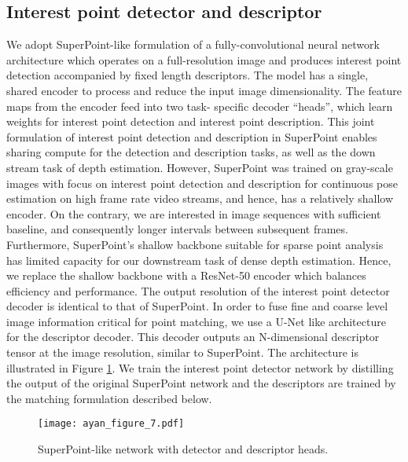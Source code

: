 \documentclass[runningheads]{llncs}
\begin{document}
\subsection{Interest point detector and descriptor}
We adopt SuperPoint-like \cite{superpoint} formulation of a fully-convolutional neural network architecture which operates on a full-resolution image and produces interest point detection accompanied by fixed length descriptors. The model has a single, shared encoder to process and reduce the input image dimensionality. The feature maps from the encoder feed into two task- specific decoder “heads”, which learn weights for interest point detection and interest point description. This joint formulation of interest point detection and description in SuperPoint enables sharing compute for the detection and description tasks, as well as the down stream task of depth estimation. However, SuperPoint was trained on gray-scale images with focus on interest point detection and description for continuous pose estimation on high frame rate video streams, and hence, has a relatively shallow encoder. On the contrary, we are interested in image sequences with sufficient baseline, and consequently longer intervals between subsequent frames. Furthermore, SuperPoint's shallow backbone suitable for sparse point analysis has limited capacity for our downstream task of dense depth estimation. Hence, we replace the shallow backbone with a ResNet-50 \cite{he2016deep} encoder which balances efficiency and performance. The output resolution of the interest point detector decoder is identical to that of SuperPoint. In order to fuse fine and coarse level image information critical for point matching, we use a U-Net \cite{ronneberger2015u} like architecture for the descriptor decoder. This decoder outputs an N-dimensional descriptor tensor at  the image resolution, similar to SuperPoint. The architecture is illustrated in Figure \ref{figsuperpoint}. We train the interest point detector network by distilling the output of the original SuperPoint network and the descriptors are trained by the matching formulation described below.   


\begin{figure}[t]
\centering
\texttt{[image: ayan\_figure\_7.pdf]}
\caption{ SuperPoint-like network with detector and descriptor heads. } 
\label{figsuperpoint}
\end{figure}
\end{document}

